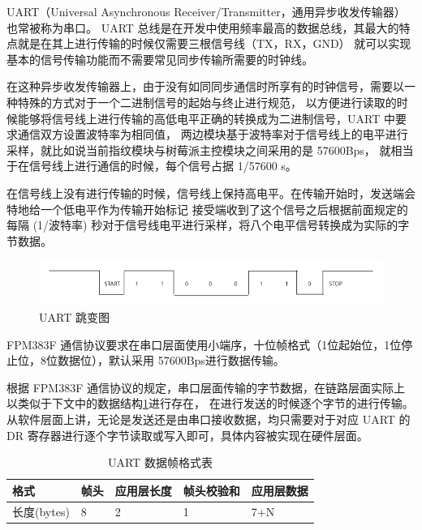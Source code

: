     UART（Universal Asynchronous Receiver/Transmitter，通用异步收发传输器）也常被称为串口。
    UART 总线是在开发中使用频率最高的数据总线，其最大的特点就是在其上进行传输的时候仅需要三根信号线（TX，RX，GND）
    就可以实现基本的信号传输功能而不需要常见同步传输所需要的时钟线。

    在这种异步收发传输器上，由于没有如同同步通信时所享有的时钟信号，需要以一种特殊的方式对于一个二进制信号的起始与终止进行规范，
    以方便进行读取的时候能够将信号线上进行传输的高低电平正确的转换成为二进制信号，UART 中要求通信双方设置波特率为相同值，
    两边模块基于波特率对于信号线上的电平进行采样，就比如说当前指纹模块与树莓派主控模块之间采用的是 57600Bps，
    就相当于在信号线上进行通信的时候，每个信号占据 1/57600 s。

    在信号线上没有进行传输的时候，信号线上保持高电平。在传输开始时，发送端会特地给一个低电平作为传输开始标记
    接受端收到了这个信号之后根据前面规定的每隔 (1/波特率) 秒对于信号线电平进行采样，将八个电平信号转换成为实际的字节数据。

    \begin{figure}[ht]
        \centering
        \includegraphics[scale=0.4]{imgs/UART跳变图.png}
        \caption{UART 跳变图}    \label{fig::uart}
    \end{figure}

    FPM383F 通信协议要求在串口层面使用小端序，十位帧格式（1位起始位，1位停止位，8位数据位），默认采用 57600Bps进行数据传输。
    \cite{noauthor_fpm383c_nodate}

    根据 FPM383F 通信协议的规定，串口层面传输的字节数据，在链路层面实际上以类似于下文中的数据结构\ref{FPM383F::UARTdataFrame}进行存在，
    在进行发送的时候逐个字节的进行传输。\cite{noauthor_fpm383c_nodate}
    从软件层面上讲，无论是发送还是由串口接收数据，均只需要对于对应 UART 的 DR 寄存器进行逐个字节读取或写入即可，具体内容被实现在硬件层面。
    
    \begin{table}[ht]
        \centering
        \begin{tabular}{|l|l|l|l|l|}
        \hline
        格式        & 帧头 & 应用层长度 & 帧头校验和 & 应用层数据 \\ \hline
        长度(bytes) & 8  & 2     & 1     & 7+N   \\ \hline
        \end{tabular}
        \caption{UART 数据帧格式表} \label{FPM383F::UARTdataFrame}
    \end{table}
    
